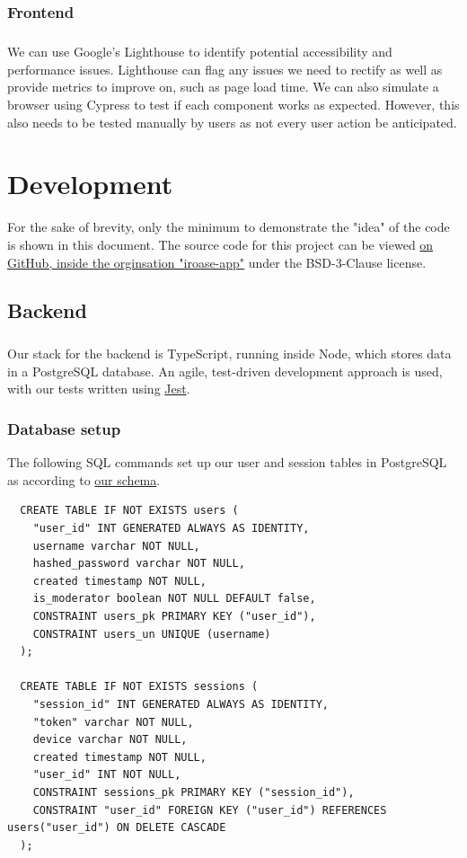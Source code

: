 \documentclass{report}
\begin{document}
\subsection{Frontend}
\paragraph{}
We can use Google's Lighthouse to identify potential accessibility and performance issues. Lighthouse can flag any issues we need to rectify as well as provide metrics to improve on, such as page load time. We can also simulate a browser using Cypress to test if each component works as expected. However, this also needs to be tested manually by users as not every user action be anticipated.

\chapter{Development}
For the sake of brevity, only the minimum to demonstrate the "idea" of the code is shown in this document. The source code for this project can be viewed \href{https://github.com/iroase-app}{on GitHub, inside the orginsation "iroase-app"} under the BSD-3-Clause license.

\section{Backend}
\paragraph{}
Our stack for the backend is TypeScript, running inside Node, which stores data in a PostgreSQL database. An agile, test-driven development approach is used, with our tests written using \href{https://jestjs.io}{Jest}.

\subsection{Database setup}
The following SQL commands set up our user and session tables in PostgreSQL as according to \hyperref[fig:database1]{our schema}.

\begin{verbatim}
  CREATE TABLE IF NOT EXISTS users (
    "user_id" INT GENERATED ALWAYS AS IDENTITY,
    username varchar NOT NULL,
    hashed_password varchar NOT NULL,
    created timestamp NOT NULL,
    is_moderator boolean NOT NULL DEFAULT false,
    CONSTRAINT users_pk PRIMARY KEY ("user_id"),
    CONSTRAINT users_un UNIQUE (username)
  );

  CREATE TABLE IF NOT EXISTS sessions (
    "session_id" INT GENERATED ALWAYS AS IDENTITY,
    "token" varchar NOT NULL,
    device varchar NOT NULL,
    created timestamp NOT NULL,
    "user_id" INT NOT NULL,
    CONSTRAINT sessions_pk PRIMARY KEY ("session_id"),
    CONSTRAINT "user_id" FOREIGN KEY ("user_id") REFERENCES users("user_id") ON DELETE CASCADE
  );
\end{verbatim}
\end{document}
